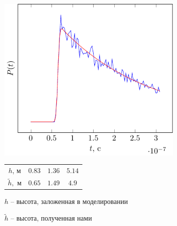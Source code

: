 \documentclass[10pt,pdf,hyperref={unicode}, dvipsnames]{beamer}
\begin{document}
\begin{frame}
\begin{figure}
\begin{subfigure}{0.42\linewidth}
    \end{subfigure}
    \hfill
    \begin{subfigure}{0.42\linewidth}
        \centering
        \includegraphics[width=1\linewidth,page=3]{fig/retracking/model}
    \end{subfigure}
    \hfill
    \begin{subfigure}{0.42\linewidth}
        \centering
        \begin{tabular}{|c|c|c|c|}
            \hline
            $h$, м      & $0.83$ & $1.36$ & $5.14$\\
            $\tilde h,$ м & $0.65$ & $1.49$ & $4.9$\\
            \hline
        \end{tabular}

        \vspace{\baselineskip}

        $h$ -- высота, заложенная в моделировании

        $\tilde h$ -- высота, полученная нами
    \end{subfigure}

\end{figure}
\end{frame}
\end{document}
